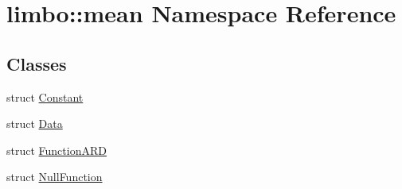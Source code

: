 \hypertarget{namespacelimbo_1_1mean}{}\section{limbo\+:\+:mean Namespace Reference}
\label{namespacelimbo_1_1mean}
\subsection*{Classes}
\begin{DoxyCompactItemize}
\item 
struct \hyperlink{structlimbo_1_1mean_1_1_constant}{Constant}
\item 
struct \hyperlink{structlimbo_1_1mean_1_1_data}{Data}
\item 
struct \hyperlink{structlimbo_1_1mean_1_1_function_a_r_d}{Function\+A\+RD}
\item 
struct \hyperlink{structlimbo_1_1mean_1_1_null_function}{Null\+Function}
\end{DoxyCompactItemize}

